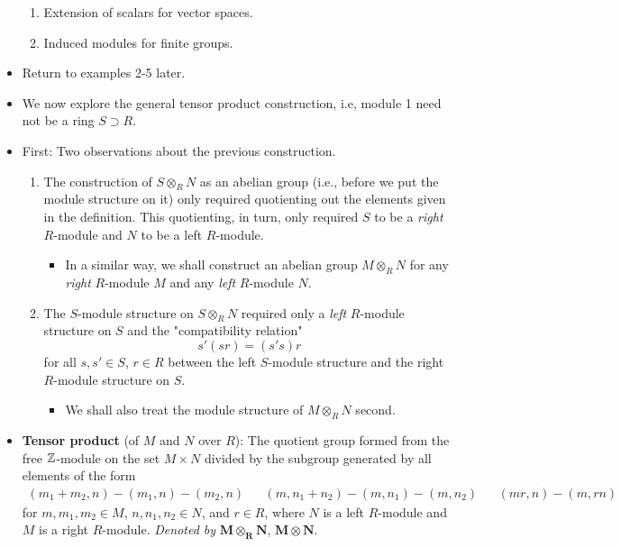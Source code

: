 \documentclass[../notes.tex]{subfiles}
\begin{document}
\begin{itemize}
\begin{enumerate}
        \item Extension of scalars for vector spaces.
        \item Induced modules for finite groups.
    \end{enumerate}
    \item Return to examples 2-5 later.
    \item We now explore the general tensor product construction, i.e, module 1 need not be a ring $S\supset R$.
    \item First: Two observations about the previous construction.
    \begin{enumerate}
        \item The construction of $S\otimes_RN$ as an abelian group (i.e., before we put the module structure on it) only required quotienting out the elements given in the definition. This quotienting, in turn, only required $S$ to be a \emph{right} $R$-module and $N$ to be a left $R$-module.
        \begin{itemize}
            \item In a similar way, we shall construct an abelian group $M\otimes_RN$ for any \emph{right} $R$-module $M$ and any \emph{left} $R$-module $N$.
        \end{itemize}
        \item The $S$-module structure on $S\otimes_RN$ required only a \emph{left} $R$-module structure on $S$ and the "compatibility relation"
        \begin{equation*}
            s'(sr) = (s's)r
        \end{equation*}
        for all $s,s'\in S$, $r\in R$ between the left $S$-module structure and the right $R$-module structure on $S$.
        \begin{itemize}
            \item We shall also treat the module structure of $M\otimes_RN$ second.
        \end{itemize}
    \end{enumerate}
    \item \textbf{Tensor product} (of $M$ and $N$ over $R$): The quotient group formed from the free $\mathbb{Z}$-module on the set $M\times N$ divided by the subgroup generated by all elements of the form
    \begin{align*}
        (m_1+m_2,n)-(m_1,n)-(m_2,n)&&
        (m,n_1+n_2)-(m,n_1)-(m,n_2)&&
        (mr,n)-(m,rn)
    \end{align*}
    for $m,m_1,m_2\in M$, $n,n_1,n_2\in N$, and $r\in R$, where $N$ is a left $R$-module and $M$ is a right $R$-module. \emph{Denoted by} $\bm{M\otimes_RN}$, $\bm{M\otimes N}$.

\end{itemize}
\end{document}
